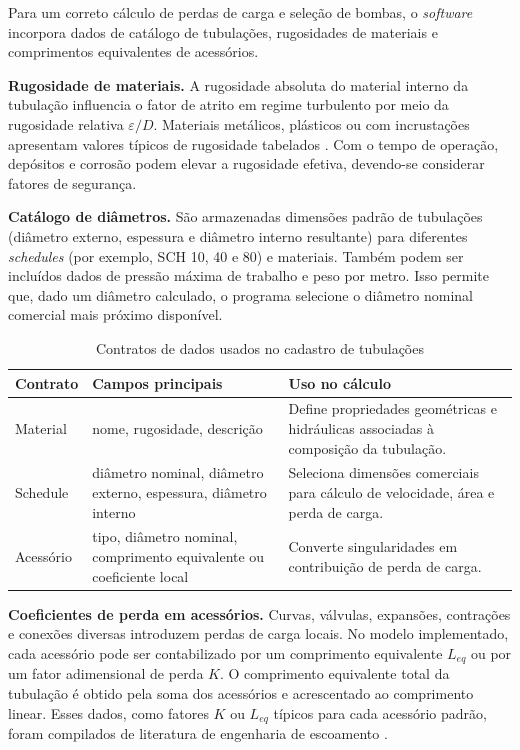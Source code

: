 Para um correto cálculo de perdas de carga e seleção de bombas, o \textit{software} incorpora dados de catálogo de tubulações, rugosidades de materiais e comprimentos equivalentes de acessórios.

\textbf{Rugosidade de materiais.} A rugosidade absoluta do material interno da tubulação influencia o fator de atrito em regime turbulento por meio da rugosidade relativa $\varepsilon/D$. Materiais metálicos, plásticos ou com incrustações apresentam valores típicos de rugosidade tabelados \cite{white2018}. Com o tempo de operação, depósitos e corrosão podem elevar a rugosidade efetiva, devendo-se considerar fatores de segurança.

\textbf{Catálogo de diâmetros.} São armazenadas dimensões padrão de tubulações (diâmetro externo, espessura e diâmetro interno resultante) para diferentes \textit{schedules} (por exemplo, SCH 10, 40 e 80) e materiais. Também podem ser incluídos dados de pressão máxima de trabalho e peso por metro. Isso permite que, dado um diâmetro calculado, o programa selecione o diâmetro nominal comercial mais próximo disponível.

\begin{table}[H]
    \centering
    \caption{Contratos de dados usados no cadastro de tubulações}
    \label{tab:contratos-tubulacoes}
    \small
    \begin{tabular}{>{\raggedright\arraybackslash}p{}>{\raggedright\arraybackslash}p{}>{\raggedright\arraybackslash}p{}}
        \hline
        \textbf{Contrato} & \textbf{Campos principais} & \textbf{Uso no cálculo} \\
        \hline
        Material & nome, rugosidade, descrição & Define propriedades geométricas e hidráulicas associadas à composição da tubulação. \\
        Schedule & diâmetro nominal, diâmetro externo, espessura, diâmetro interno & Seleciona dimensões comerciais para cálculo de velocidade, área e perda de carga. \\
        Acessório & tipo, diâmetro nominal, comprimento equivalente ou coeficiente local & Converte singularidades em contribuição de perda de carga. \\
        \hline
    \end{tabular}
\end{table}

\textbf{Coeficientes de perda em acessórios.} Curvas, válvulas, expansões, contrações e conexões diversas introduzem perdas de carga locais. No modelo implementado, cada acessório pode ser contabilizado por um comprimento equivalente $L_{eq}$ ou por um fator adimensional de perda $K$. O comprimento equivalente total da tubulação é obtido pela soma dos acessórios e acrescentado ao comprimento linear. Esses dados, como fatores $K$ ou $L_{eq}$ típicos para cada acessório padrão, foram compilados de literatura de engenharia de escoamento \cite{perry2007}.

